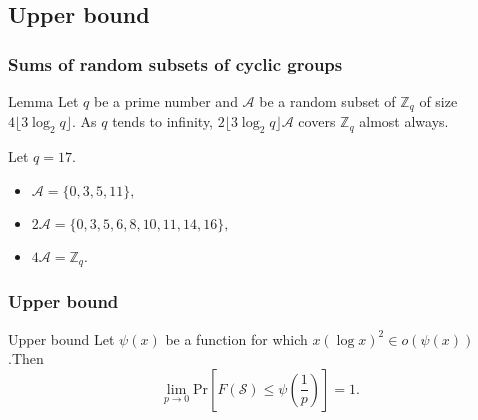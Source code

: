 \documentclass{beamer}
\def\ZZ{\ensuremath{\mathbb{Z}}}
\def\Pr{\ensuremath{\mathrm{Pr}}}
\begin{document}


\subsection{Upper bound}

\begin{frame}
\frametitle{Sums of random subsets of cyclic groups}
\begin{block}{Lemma}
    Let $q$ be a prime number and $\mathcal{A}$ be a random subset of $\mathbb{Z}_q$ of size $4\lfloor3\log_2 q\rfloor$. As $q$ tends to infinity, $2\lfloor3\log_2 q\rfloor \mathcal{A}$ covers $\mathbb{Z}_q$ almost always. 
\end{block}
\begin{example}
    Let \(q = 17\).
    \begin{itemize}
        \item\(\mathcal{A} = \{0, 3, 5, 11\},\)
        \item \(2\mathcal{A} = \{0, 3, 5, 6, 8, 10, 11, 14, 16\},\)
        \item \(4\mathcal{A} = \ZZ_q.\)
    \end{itemize}
\end{example}
\end{frame}


\begin{frame}
    \frametitle{Upper bound}
    \begin{block}{Upper bound}
        Let $\psi(x)$ be a function for which $x(\log x)^2 \in o(\psi(x))$ .Then
        \[\lim_{p \to 0}\Pr\left[F(\mathcal{S}) \leq \psi\left(\frac{1}{p}\right)\right] = 1.\] 
    \end{block}
\end{frame}
\end{document}
